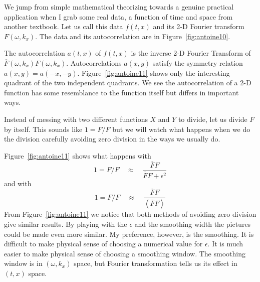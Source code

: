 
\par
We jump from simple mathematical theorizing
towards a genuine practical application when I grab some real data,
a function of time and space from another textbook.
Let us call this data $f(t,x)$ and its 2-D Fourier transform
$F(\omega, k_x)$.
The data and its autocorrelation are in Figure~\ref{fig:antoine10}.
\par
The autocorrelation $a(t,x)$ of $f(t,x)$ is
the inverse 2-D Fourier Transform  of 
$\overline{F}(\omega, k_x) F(\omega, k_x)$.
Autocorrelations $a(x,y)$
satisfy the symmetry relation
$a(x,y)=a(-x,-y)$.
Figure~\ref{fig:antoine11}
shows only the interesting quadrant of the two independent quadrants.
We see the autocorrelation of a 2-D function has some
resemblance to the function itself but differs in important ways.

\par
Instead of messing with two different functions $X$ and $Y$ to divide,
let us divide $F$ by itself.
This sounds like $1=F/F$ but we will
watch what happens when we do the division carefully
avoiding zero division in the ways we usually do.
\par
Figure~\ref{fig:antoine11} shows
what happens with
\begin{equation}
\label{eqn:z7}
1 = F/F \quad \approx \quad \frac{\overline{F}F}{\overline{F}F+\epsilon^2}
\end{equation}
and with
\begin{equation}
\label{eqn:z8}
1 = F/F \quad \approx\quad  \frac{\overline{F}F}{\left< \overline{F}F \right>}
\end{equation}
%
%
From Figure~\ref{fig:antoine11} we notice that both methods of
avoiding zero division give similar results.
By playing with the $\epsilon$ and the smoothing width
the pictures could be made even more similar.
My preference, however, is the smoothing.
It is difficult to make physical sense of choosing a numerical value
for $\epsilon$.
It is much easier to make physical sense of choosing a smoothing window.
The smoothing window is in $(\omega,k_x)$ space,
but Fourier transformation tells us its effect in $(t,x)$ space.


